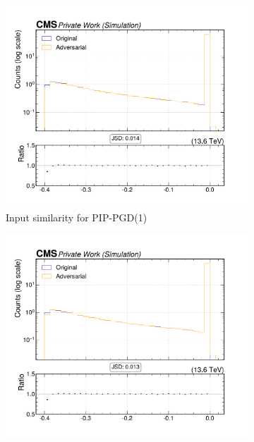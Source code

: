 \begin{figure}[htbp]
  \centering
  \begin{subfigure}[t]{0.32\textwidth}
    \includegraphics[width=\linewidth]{media/output/features/compare/combined_it_1/cmp_cpf_arr_Cpfcan_drminsv.pdf}
    \caption*{Input similarity for PIP-PGD(1)}
  \end{subfigure}\hfill
  \begin{subfigure}[t]{0.32\textwidth}
    \includegraphics[width=\linewidth]{media/output/features/compare/combined_it_2/cmp_cpf_arr_Cpfcan_drminsv.pdf}

\end{subfigure}
\end{figure}
